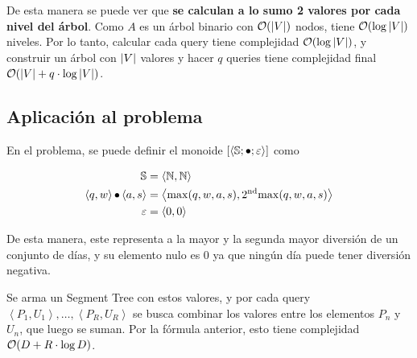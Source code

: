 De esta manera se puede ver que \textbf{se calculan a lo sumo 2 valores por cada nivel del árbol}. Como \(A\) es un árbol binario con \(\mathcal{O}(\left|V\right|)\) nodos, tiene \(\mathcal{O}(\log \left|V\right|)\) niveles. Por lo tanto, calcular cada query tiene complejidad \(\mathcal{O}(\log \left|V\right|)\), y construir un árbol con \(\left|V\right|\) valores y hacer \(q\) queries tiene complejidad final \(\mathcal{O}(\left|V\right| + q \cdot \log \left|V\right|)\).

\subsection{Aplicación al problema}

En el problema, se puede definir el monoide \(\left[\left<\mathbb{S}; \operatorname{\bullet}; \mathbf{\varepsilon}\right>\right]\) como

\[
\begin{split}
	\mathbb{S} &= \left<\mathbb{N}, \mathbb{N}\right> \\
	\left<q, w\right> \operatorname{\bullet} \left<a, s\right> &= \left<\operatorname{max}(q, w, a, s), \operatorname{2^{nd}max}(q, w, a, s)\right> \\
	\mathbf{\varepsilon} &= \left<0, 0\right>
\end{split}
\]

De esta manera, este representa a la mayor y la segunda mayor diversión de un conjunto de días, y su elemento nulo es 0 ya que ningún día puede tener diversión negativa.

Se arma un Segment Tree con estos valores, y por cada query \(\left<P_1, U_1\right>, \dots, \left<P_R, U_R\right>\) se busca combinar los valores entre los elementos \(P_n\) y \(U_n\), que luego se suman. Por la fórmula anterior, esto tiene complejidad \(\mathcal{O}(D + R \cdot \log D)\).
